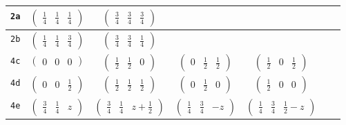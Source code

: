\documentclass[fleqn,9pt,landscape]{jsarticle}
\begin{document}
\begin{center}
\begin{longtable}{ccccccc}
{\tt 2a} & $ \begin{pmatrix} \frac{1}{4} & \frac{1}{4} & \frac{1}{4} \end{pmatrix} $ & $ \begin{pmatrix} \frac{3}{4} & \frac{3}{4} & \frac{3}{4} \end{pmatrix} $ & $  $ & $  $ & $  $ & $  $ \\ \hline
{\tt 2b} & $ \begin{pmatrix} \frac{1}{4} & \frac{1}{4} & \frac{3}{4} \end{pmatrix} $ & $ \begin{pmatrix} \frac{3}{4} & \frac{3}{4} & \frac{1}{4} \end{pmatrix} $ & $  $ & $  $ & $  $ & $  $ \\ \hline
{\tt 4c} & $ \begin{pmatrix} 0 & 0 & 0 \end{pmatrix} $ & $ \begin{pmatrix} \frac{1}{2} & \frac{1}{2} & 0 \end{pmatrix} $ & $ \begin{pmatrix} 0 & \frac{1}{2} & \frac{1}{2} \end{pmatrix} $ & $ \begin{pmatrix} \frac{1}{2} & 0 & \frac{1}{2} \end{pmatrix} $ & $  $ & $  $ \\ \hline
{\tt 4d} & $ \begin{pmatrix} 0 & 0 & \frac{1}{2} \end{pmatrix} $ & $ \begin{pmatrix} \frac{1}{2} & \frac{1}{2} & \frac{1}{2} \end{pmatrix} $ & $ \begin{pmatrix} 0 & \frac{1}{2} & 0 \end{pmatrix} $ & $ \begin{pmatrix} \frac{1}{2} & 0 & 0 \end{pmatrix} $ & $  $ & $  $ \\ \hline
{\tt 4e} & $ \begin{pmatrix} \frac{3}{4} & \frac{1}{4} & z \end{pmatrix} $ & $ \begin{pmatrix} \frac{3}{4} & \frac{1}{4} & z + \frac{1}{2} \end{pmatrix} $ & $ \begin{pmatrix} \frac{1}{4} & \frac{3}{4} & - z \end{pmatrix} $ & $ \begin{pmatrix} \frac{1}{4} & \frac{3}{4} & \frac{1}{2} - z \end{pmatrix} $ & $  $ & $  $ \\ \hline

\end{longtable}
\end{center}
\end{document}
